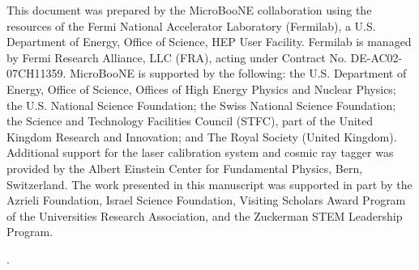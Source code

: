 \documentclass[aps,prl,showpacs,twocolumn,superscriptaddress,letterpaper,longbibliography]{revtex4-1}
\begin{document}
\begin{acknowledgments}
This document was prepared by the MicroBooNE collaboration using the resources of the Fermi National Accelerator Laboratory (Fermilab), a U.S. Department of Energy, Office of Science, HEP User Facility. Fermilab is managed by Fermi Research Alliance, LLC (FRA), acting under Contract No. DE-AC02-07CH11359.  MicroBooNE is supported by the following: the U.S. Department of Energy, Office of Science, Offices of High Energy Physics and Nuclear Physics; the U.S. National Science Foundation; the Swiss National Science Foundation; the Science and Technology Facilities Council (STFC), part of the United Kingdom Research and Innovation; and The Royal Society (United Kingdom). Additional support for the laser calibration system and cosmic ray tagger was provided by the Albert Einstein Center for Fundamental Physics, Bern, Switzerland. The work presented in this manuscript was supported in part by the Azrieli Foundation, Israel Science Foundation, Visiting Scholars Award Program of the Universities Research Association, and the Zuckerman STEM Leadership Program.
\end{acknowledgments}


\nocite{suppl,Heck:1998vt,Nieves:2012yz,Schwehr:2016pvn,Nowak:2009se,Kuzmin:2003ji,Berger:2007rq,Graczyk:2007bc,Berger:2008xs,Ashery:1981tq,Bodek:2017hat,Graczyk:2007bc,Leitner:2006ww,Mosel:2019vhx,Sjostrand:2006za}.

	
	
\end{document}
